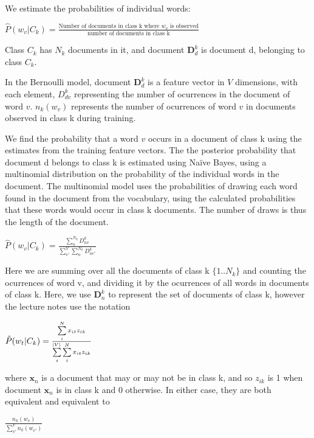 \documentclass[10pt,a4paper]{article}
\newcommand{\su}[2]{\sum\limits_{#1}^{#2}}
\begin{document}
		
		We estimate the probabilities of individual words:
		
		\begin{center}
			$ \hat P(w_v|C_k) = \frac{\text{Number of documents in class k where $w_v$ is observed}}{\text{number of documents in class k}}$
		\end{center}
		
		Class $C_k$ has $N_k$ documents in it, and document $\bm D_d^k$ is document d, belonging to class $C_k$.
		
		In the Bernoulli model, document $\bm D_d^k$ is a feature vector in $V$ dimensions, with each element, $D_{dv}^k$ representing the number of ocurrences in the document of word $v$. $n_k(w_v)$ represents the number of ocurrences of word $v$ in documents observed in class k during training. 
		
		We find the probability that a word $v$ occurs in a document of class k using the estimates from the training feature vectors. The the posterior probability that document d belongs to class k is estimated using Naïve Bayes, using a multinomial distribution on the probability of the individual words in the document. The multinomial model  uses the probabilities of drawing each word found in the document from the vocabulary, using the calculated probabilities that these words would occur in class k documents. The number of draws is thus the length of the document.
		
		\begin{center}
			{\LARGE $ \hat P(w_v|C_k) = \frac{\su{n}{N_k} D^k_{nv}}{ \su{v'}{V} \su{n}{N_k} D^k_{nv'}  } $ }
		\end{center} 
		
		Here we are summing over all the documents of class k $\{1..N_k\}$ and counting the ocurrences of word v, and dividing it by the ocurrences of all words in documents of class k. Here, we use $\bm D^k_n$ to represent the set of documents of class k, however the lecture notes use the notation 
		
		\begin{center}
			{\LARGE $ \hat P(w_t|C_k) = \frac{\su{i}{N} x_{it}z_{ik}} {\su{s}{\abs V} \su{i}{N} x_{it}z_{ik}} $ }
		\end{center} 
		
		where $\bm x_n$ is a document that may or may not be in class k, and so $z_{ik}$ is 1 when document $\bm x_n$ is in class k and 0 otherwise. In either case, they are both equivalent and equivalent to
		
		\begin{center}
			{\LARGE $\frac{n_k(w_v)}{\su{v'}{V}n_k(w_{v'})}$ }
		\end{center}
		
\end{document}
